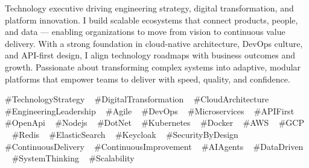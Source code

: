 
\begin{cvparagraph}

Technology executive driving engineering strategy, digital transformation, and platform innovation. 
I build scalable ecosystems that connect products, people, and data — enabling organizations to move from vision to continuous value delivery. 
With a strong foundation in cloud-native architecture, DevOps culture, and API-first design, I align technology roadmaps with business outcomes and growth. 
Passionate about transforming complex systems into adaptive, modular platforms that empower teams to deliver with speed, quality, and confidence.
\end{cvparagraph}

\begin{cvtechnologies}
 \#TechnologyStrategy ~
 \#DigitalTransformation ~
 \#CloudArchitecture ~
 \#EngineeringLeadership ~
 \#Agile ~
 \#DevOps ~
 \#Microservices ~
 \#APIFirst ~
 \#OpenApi ~
 \#Nodejs ~
 \#DotNet ~
 \#Kubernetes ~
 \#Docker ~
 \#AWS ~
 \#GCP ~
 \#Redis ~
 \#ElasticSearch ~
 \#Keycloak ~
 \#SecurityByDesign ~
 \#ContinuousDelivery ~
 \#ContinuousImprovement ~
 \#AIAgents ~
 \#DataDriven ~
 \#SystemThinking ~
 \#Scalability ~
\end{cvtechnologies}

